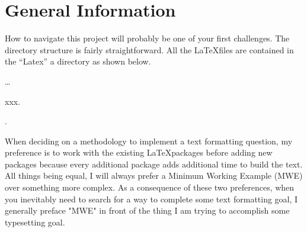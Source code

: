 \section{General Information}
\label{section:howGeneralInformation}
How to navigate this project will probably be one of your first challenges.
The directory structure is fairly straightforward.  All the \LaTeX files are contained
in the ``Latex'' a directory as shown below.


\ldots{} \begin{minipage}[t]{10cm} xxx{.}	\end{minipage}.

\vspace{0.5cm}

When deciding on a methodology to implement a text formatting question,
my preference is to work with the existing \LaTeX packages before adding new
packages because every additional package adds additional time to build the
text.  All things being equal, I will always prefer a Minimum Working Example 
(MWE) over something more complex.  As a consequence of these two preferences,
when you inevitably need to search for a way to complete some text formatting
goal, I generally preface "MWE" in front of the thing I am trying to accomplish
some typesetting goal.

